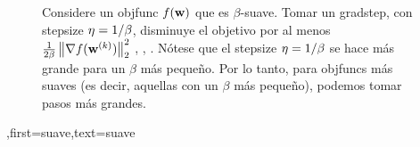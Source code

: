 {{\begin{figure}[H]
\begin{center}
				\end{center}
				\caption{Considere un \gls{objfunc} $f({\bf w})$ que es $\beta$-suave. 
					Tomar un \gls{gradstep}, con \gls{stepsize} $\eta = 1/\beta$, disminuye el 
					objetivo por al menos $\frac{1}{2\beta}\left\Vert {\nabla f({\bf w}^{(k)})} \right\Vert_{2}^{2}$ \cite{nesterov04}, \cite{CvxBubeck2015}, \cite{CvxAlgBertsekas}. 
					Nótese que el \gls{stepsize} $\eta = 1/\beta$ se hace más grande para un $\beta$ más pequeño. Por lo tanto, 
					para \gls{objfunc}s más suaves (es decir, aquellas con un $\beta$ más pequeño), 
					podemos tomar pasos más grandes. \label{fig_gd_smooth_dict}}
				\end{figure}
			},first={suave},text={suave}}

